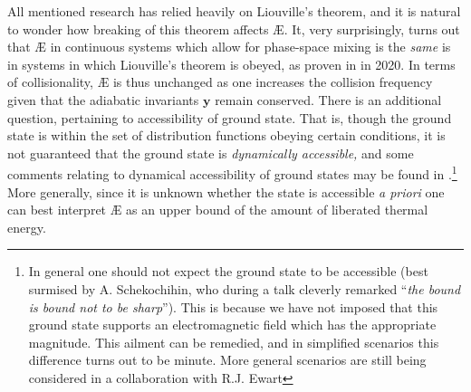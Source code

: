 All mentioned research has relied heavily on Liouville's theorem, and it is natural to wonder how breaking of this theorem affects \AE{}. It, very surprisingly, turns out that \AE{} in continuous systems which allow for phase-space mixing is the \textit{same} is in systems in which Liouville's theorem is obeyed, as proven in \citet{kolmes2020recovering} in 2020. In terms of collisionality, \AE{} is thus unchanged as one increases the collision frequency given that the adiabatic invariants $\boldsymbol{y}$ remain conserved. There is an additional question, pertaining to accessibility of ground state. That is, though the ground state is within the set of distribution functions obeying certain conditions, it is not guaranteed that the ground state is {\it dynamically accessible,} and some comments relating to dynamical accessibility of ground states may be found in \citet{ewart2022collisionless}.\footnote{In general one should not expect the ground state to be accessible (best surmised by A. Schekochihin, who during a talk cleverly remarked ``\textit{the bound is bound not to be sharp}''). This is because we have not imposed that this ground state supports an electromagnetic field which has the appropriate magnitude. This ailment can be remedied, and in simplified scenarios this difference turns out to be minute. More general scenarios are still being considered in a collaboration with R.J. Ewart} More generally, since it is unknown whether the state is accessible \textit{a priori} one can best interpret \AE{} as an upper bound of the amount of liberated thermal energy. 

